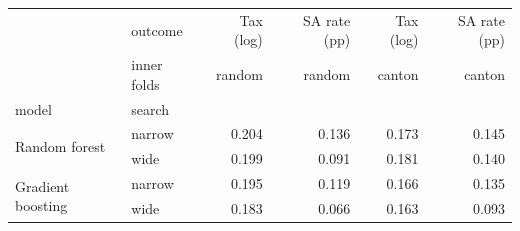 \begin{tabular}{llrrrr}
\toprule
 & outcome & Tax (log) & SA rate (pp) & Tax (log) & SA rate (pp) \\
 & inner folds & random & random & canton & canton \\
model & search &  &  &  &  \\
\midrule
\multirow[t]{2}{*}{Random forest} & narrow & 0.204 & 0.136 & 0.173 & 0.145 \\
 & wide & 0.199 & 0.091 & 0.181 & 0.140 \\
\cline{1-6}
\multirow[t]{2}{*}{Gradient boosting} & narrow & 0.195 & 0.119 & 0.166 & 0.135 \\
 & wide & 0.183 & 0.066 & 0.163 & 0.093 \\
\cline{1-6}
\bottomrule
\end{tabular}
